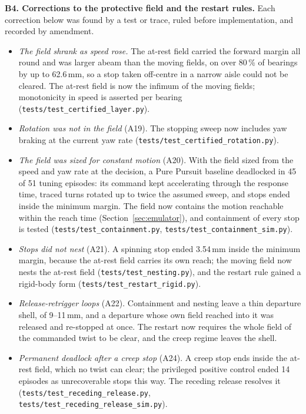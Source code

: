 \documentclass[sensors,article,submit,moreauthors]{Definitions/mdpi}
\begin{document}
\textbf{B4. Corrections to the protective field and the restart rules.}
Each correction below was found by a test or trace, ruled before implementation, and recorded by amendment.
\begin{itemize}
\item \emph{The field shrank as speed rose.} The at-rest field carried the forward margin all round and was larger abeam than the moving fields, on over 80\,\% of bearings by up to 62.6\,mm, so a stop taken off-centre in a narrow aisle could not be cleared. The at-rest field is now the infimum of the moving fields; monotonicity in speed is asserted per bearing (\texttt{tests/test\_certified\_layer.py}).
\item \emph{Rotation was not in the field} (A19). The stopping sweep now includes yaw braking at the current yaw rate (\texttt{tests/test\_certified\_rotation.py}).
\item \emph{The field was sized for constant motion} (A20). With the field sized from the speed and yaw rate at the decision, a Pure Pursuit baseline deadlocked in 45 of 51 tuning episodes: its command kept accelerating through the response time, traced turns rotated up to twice the assumed sweep, and stops ended inside the minimum margin. The field now contains the motion reachable within the reach time (Section~\ref{sec:emulator}), and containment of every stop is tested (\texttt{tests/test\_containment.py}, \texttt{tests/test\_containment\_sim.py}).
\item \emph{Stops did not nest} (A21). A spinning stop ended 3.54\,mm inside the minimum margin, because the at-rest field carries its own reach; the moving field now nests the at-rest field (\texttt{tests/test\_nesting.py}), and the restart rule gained a rigid-body form (\texttt{tests/test\_restart\_rigid.py}).
\item \emph{Release-retrigger loops} (A22). Containment and nesting leave a thin departure shell, of 9--11\,mm, and a departure whose own field reached into it was released and re-stopped at once. The restart now requires the whole field of the commanded twist to be clear, and the creep regime leaves the shell.
\item \emph{Permanent deadlock after a creep stop} (A24). A creep stop ends inside the at-rest field, which no twist can clear; the privileged positive control ended 14 episodes as unrecoverable stops this way. The receding release resolves it (\texttt{tests/test\_receding\_release.py}, \texttt{tests/test\_receding\_release\_sim.py}).
\end{itemize}
\end{document}
